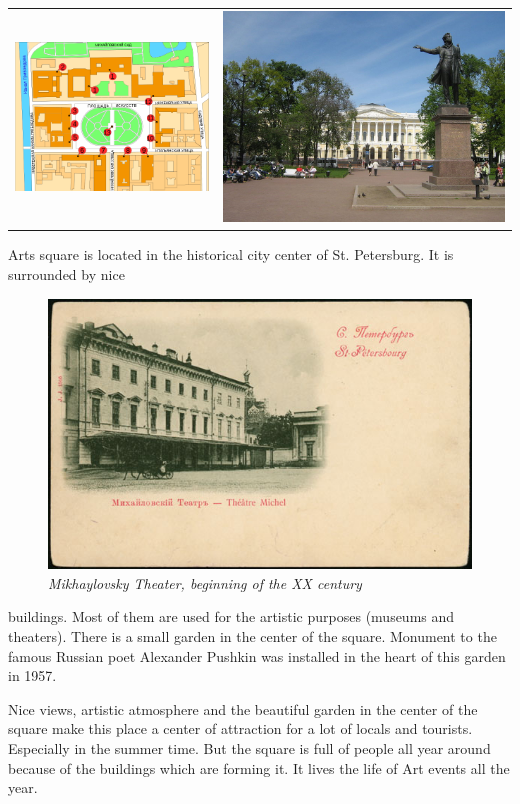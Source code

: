 \documentclass[a4paper]{article}
\begin{document}
\begin{tabular}{ll}
\includegraphics[keepaspectratio,width=.48\textwidth]{artsqplan}&
\includegraphics[keepaspectratio,width=.48\textwidth]{pushkin}
\end{tabular}

Arts square is located in the historical city center of St. Petersburg. It is surrounded by nice
\begin{figure}
\includegraphics[keepaspectratio,width=.4\textwidth]{opera}
\textit{Mikhaylovsky Theater, beginning of the XX century}
\vspace*{-.3cm}
\end{figure}
buildings. Most of them are used for the artistic purposes (museums
and theaters). There is a small garden in the center of the square. Monument to the famous Russian poet Alexander Pushkin was installed in the heart of this garden in 1957.

Nice views, artistic atmosphere and the beautiful garden in the center of the square make this place a center of attraction for a lot of locals and tourists. Especially in the summer time.
But the square is full of people all year around because of the buildings which are forming it. It lives the life of Art events all the year.
\end{document}
